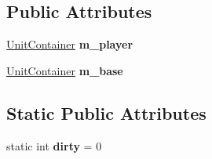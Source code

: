 \subsection*{Public Attributes}
\begin{DoxyCompactItemize}
\item 
\hyperlink{classUnitContainer}{Unit\+Container} {\bfseries m\+\_\+player}\hypertarget{classBaseComputer_a9fe5bf690700e885393bcaa9f9143e22}{}\label{classBaseComputer_a9fe5bf690700e885393bcaa9f9143e22}

\item 
\hyperlink{classUnitContainer}{Unit\+Container} {\bfseries m\+\_\+base}\hypertarget{classBaseComputer_a7efa5d8b56ef32eea1217e572853fc6b}{}\label{classBaseComputer_a7efa5d8b56ef32eea1217e572853fc6b}

\end{DoxyCompactItemize}
\subsection*{Static Public Attributes}
\begin{DoxyCompactItemize}
\item 
static int {\bfseries dirty} = 0\hypertarget{classBaseComputer_a9c5238be605fc4cdbb6d4993de1d028e}{}\label{classBaseComputer_a9c5238be605fc4cdbb6d4993de1d028e}

\end{DoxyCompactItemize}
